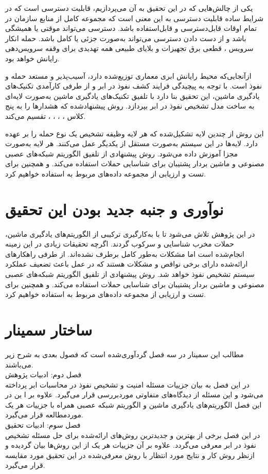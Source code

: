 \documentclass[a4paper,oneside,12pt]{report}
\begin{document}
یکی از چالش‌هایی که در این تحقیق به آن می‌پردازیم، قابلیت دسترسی است که در شرایط ساده قابلیت دسترسی به این معنی است که مجموعه کامل از منابع سازمان در تمام اوقات قابل‌دسترسی و قابل‌استفاده باشد. دسترسی می‌تواند موقتی یا همیشگی باشد و از دست دادن دسترسی می‌تواند به‌صورت جزئی یا کامل باشد. حمله انکار سرویس 
، 
قطعی برق تجهیزات و بلایای طبیعی همه تهدیدی برای وقفه سرویس‌دهی رایانش خواهد بود.

ازآنجایی‌که محیط رایانش ابری معماری توزیع‌شده دارد، آسیب‌پذیر و مستعد حمله و نفوذ است. با توجه به پیچیدگی فرایند کشف نفوذ در ابر و از طرفی کارآمدی تکنیک‌های یادگیری ماشین، این تحقیق بنا دارد با تلفیق تکنیک‌های یادگیری ماشین به‌صورت لایه‌ای به ساخت مدل تشخیص نفوذ در ابر بپردازد. روش پیشنهادشده که هشدارها را به پنج کلاس 
،
، 
، 
%
،
%
تقسیم می‌کند.

این روش از چندین لایه تشکیل‌شده که هر لایه وظیفه تشخیص یک نوع حمله را بر عهده دارد. لایه‌ها در این سیستم به‌صورت مستقل از یکدیگر عمل می‌کنند. هر لایه به‌صورت مجزا آموزش داده می‌شود. روش پیشنهادی از تلفیق الگوریتم شبکه‌های عصبی مصنوعی و ماشین بردار پشتیبان برای شناسایی حملات استفاده می‌کند. و همچنین برای تست و ارزیابی از مجموعه داده‌های مربوط به 
استفاده خواهیم کرد.
\section{نوآوری و جنبه جدید بودن این تحقیق}
در این پژوهش تلاش می‌شود تا با به‌کارگیری ترکیبی از الگوریتم‌های یادگیری ماشین، حملات مخرب شناسایی و سرکوب گردند. اگرچه تحقیقات زیادی در این زمینه انجام‌شده است اما مشکلات به‌طور کامل برطرف نشده‌اند. از طرفی راهکارهای ارائه‌شده دارای برخی نواقص و مشکلات هستند که در عمل باعث تضعیف عملکرد سیستم تشخیص نفوذ خواهد شد. روش پیشنهادی از تلفیق الگوریتم شبکه‌های عصبی مصنوعی و ماشین بردار پشتیبان برای شناسایی حملات استفاده می‌کند. و همچنین برای تست و ارزیابی از مجموعه داده‌های مربوط به 
استفاده خواهیم کرد.
\section{ساختار سمینار}
مطالب این سمینار در سه فصل گردآوری‌شده است که فصول بعدی به شرح زیر می‌باشند.
\\[0.5cm]
فصل دوم: ادبیات پژوهش
\\[0.5cm]
در این فصل به بیان جزییات مسئله امنیت و تشخیص نفوذ در محاسبات ابر پرداخته می‌شود و این مسئله از دیدگاه‌های متفاوتی موردبررسی قرار می‌گیرد. علاوه بر ا ین در این فصل الگوریتم‌های یادگیری ماشین و الگوریتم شبکه عصبی همراه با جزییات هر یک موردمطالعه قرار می‌گیرد.
\\[0.5cm]
فصل سوم: ادبیات تحقیق
\\[0.5cm]
 در این فصل برخی از بهترین و جدیدترین روش‌های ارائه‌شده برای حل مسئله تشخیص نفوذ در ابر معرفی می‌گردد. علاوه بر آن جزییات هر یک از این روش‌ها بیان گردیده و ازنظر روش کار و نتایج مورد انتظار با روش معرفی‌شده در این تحقیق مورد مقایسه قرار می‌گیرد.
\end{document}
